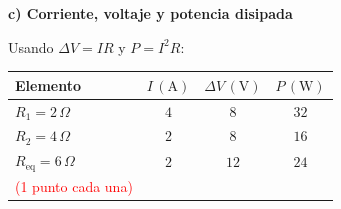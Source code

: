 \documentclass[11pt,a4paper]{article}
\begin{document}
\medskip
\textbf{c) Corriente, voltaje y potencia disipada}\par
Usando $\Delta V=IR$ y $P=I^2R$:
\begin{center}
\begin{tabular}{lccc}
\toprule
Elemento & $I\,(\mathrm A)$ & $\Delta V\,(\mathrm V)$ & $P\,(\mathrm W)$\\
\midrule
$R_1=2\,\Omega$ & $4$ & $8$ & $32$\\
$R_2=4\,\Omega$ & $2$ & $8$ & $16$\\
$R_{\mathrm{eq}}=6\,\Omega$ & $2$ & $12$ & $24$\\
\bottomrule
\textcolor{red}{(1 punto cada una)}
\end{tabular}
\end{center}
\end{document}
